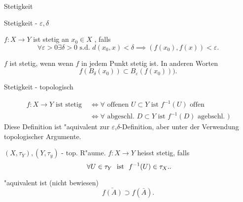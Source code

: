 \documentclass[class=article, crop=false]{standalone}
\begin{document}
\begin{zettel}{Stetigkeit}
\begin{flashcard}

\begin{question}
    Stetigkeit - $\varepsilon, \delta $ 
\end{question}

\begin{definition}[Stetigkeit]
    $f:X \longrightarrow Y$ ist stetig an $x_0 \in  X$ , falls
\[
    \forall \varepsilon >  0 \exists  \delta  > 0 \text{ s.d. }  d (x_0 , x) < \delta \implies (f (x_0), f (x)) <  \varepsilon
.\]

    $f$ ist stetig, wenn wenn $f$ in jedem Punkt stetig ist.
    In anderen Worten
\[
    f (B_{\delta }(x_0)) \subset B_{\varepsilon } (f (x_0)) )
.\]
\end{definition}
\end{flashcard}

\begin{flashcard}
\begin{question}
    Stetigkeit - topologisch
\end{question}
\begin{definition}[Stetigkeit]
\begin{align*}
    f:X \longrightarrow Y \text{ ist stetig }  &\iff \forall \text{ offenen } U \subset Y \text{ ist } f^{-1} (U) \text{ offen } \\
                                               &\iff \forall  \text{ abgeschl. } D \subset Y \text{ ist } f^{-1} (D) \text{ agebschl. } )
\end{align*}
    Diese Definition ist "aquivalent zur $\varepsilon $,$\delta$-Definition, aber unter der Verwendung topologischer Argumente.
\end{definition}
\end{flashcard}

\begin{definition}[Stetigkeit]
   $(X, \tau_Y), (Y, \tau_y)$  - top. R"aume. $f:X \longrightarrow Y$ heisst stetig, falls
   \[
       \forall U \in  \tau_Y \tx{ ist } f^{-1} (U) \in  \tau_X.
   .\]
\end{definition}

"aquivalent ist (nicht bewiesen)
\[
    \bar{f(A)} \supset f (\bar{A}) 
.\]

\end{zettel}
\end{document}
